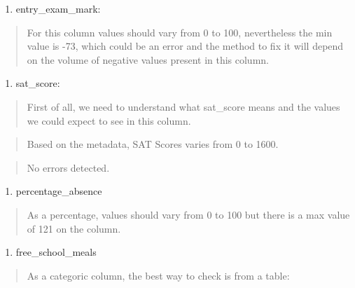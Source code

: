 \documentclass[
]{article}
\newenvironment{Shaded}{\begin{snugshade}}{\end{snugshade}}
\newcommand{\FunctionTok}[1]{\textcolor[rgb]{0.13,0.29,0.53}{\textbf{#1}}}
\newcommand{\NormalTok}[1]{#1}
\newcommand{\SpecialCharTok}[1]{\textcolor[rgb]{0.81,0.36,0.00}{\textbf{#1}}}
\providecommand{\tightlist}{%
  \setlength{\itemsep}{0pt}\setlength{\parskip}{0pt}}
\begin{document}
\begin{enumerate}
\def\labelenumi{\arabic{enumi}.}
\setcounter{enumi}{1}
\tightlist
\item
  entry\_exam\_mark:
\end{enumerate}

\begin{quote}
For this column values should vary from 0 to 100, nevertheless the min
value is -73, which could be an error and the method to fix it will
depend on the volume of negative values present in this column.
\end{quote}

\begin{enumerate}
\def\labelenumi{\arabic{enumi}.}
\setcounter{enumi}{2}
\tightlist
\item
  sat\_score:
\end{enumerate}

\begin{quote}
First of all, we need to understand what sat\_score means and the values
we could expect to see in this column.
\end{quote}

\begin{quote}
Based on the metadata, SAT Scores varies from 0 to 1600.
\end{quote}

\begin{quote}
No errors detected.
\end{quote}

\begin{enumerate}
\def\labelenumi{\arabic{enumi}.}
\setcounter{enumi}{3}
\tightlist
\item
  percentage\_absence
\end{enumerate}

\begin{quote}
As a percentage, values should vary from 0 to 100 but there is a max
value of 121 on the column.
\end{quote}

\begin{enumerate}
\def\labelenumi{\arabic{enumi}.}
\setcounter{enumi}{4}
\tightlist
\item
  free\_school\_meals
\end{enumerate}

\begin{quote}
As a categoric column, the best way to check is from a table:
\end{quote}

\begin{Shaded}
\end{Shaded}
\end{document}
